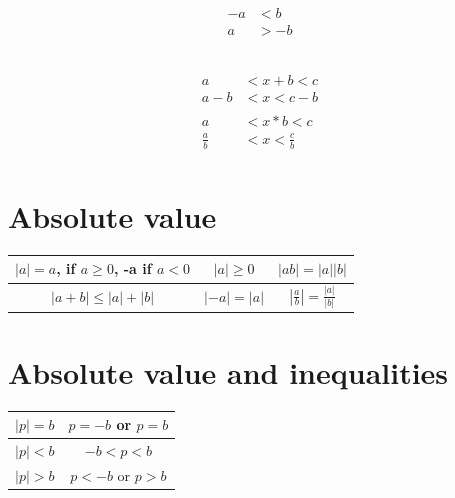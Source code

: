 \documentclass[10pt,onecolumn]{article}
\begin{document}
{ \\
\begin{align*}
-a &< b \\
a &> -b
\end{align*}

 \\
\begin{align*}
a 	&< x + b 	< c \\
a - b 	&< x 		< c - b \\ 
\\
a &< x*b < c \\
\frac{a}{b}  &< x < \frac{c}{b} \\
\end{align*}

\pagebreak
\section{Absolute value}
\begin{center}
{\renewcommand{\arraystretch}{2}
\begin{tabular}{| c | c | c |}
\hline
$\left|a\right| = a $, if $a \ge 0$, -a if $a < 0$ &
$\left|a\right| \ge 0 $ &
$\left|ab\right| = \left|a\right|\left|b\right| $ \\
\hline
$\left|a+b\right| \le \left|a\right| + \left|b\right|$ &
$\left|-a\right| = \left|a\right| $ &
$\left|\frac{a}{b}\right| = \frac{\left|a\right|}{\left|b\right|} $ \\
\hline
\end{tabular}}
\end{center}

\section{Absolute value and inequalities}
\begin{center}
{\renewcommand{\arraystretch}{2}
\begin{tabular}{| c | c |}
\hline
$\left|p\right| = b $ & $p = -b $ or $ p = b $ \\
\hline
$\left|p\right| < b $ & $-b < p < b $ \\
\hline
$\left|p\right| > b $ & $p < -b $ or $ p > b $ \\
\hline
\end{tabular}}
\end{center}

}
\end{document}
